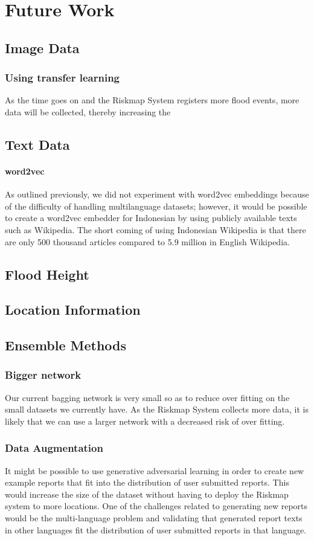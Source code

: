 \chapter{Future Work}

\section{Image Data}
\subsection{Using transfer learning}
As the time goes on and the Riskmap System registers more flood events, 
more data will be collected, thereby increasing the  

\section{Text Data}
\subsubsection{word2vec}
As outlined previously, we did not experiment with word2vec embeddings because
of the difficulty of handling multilanguage datasets; however, it would be
possible to create a word2vec embedder for Indonesian by using publicly
available texts such as Wikipedia. The short coming of using Indonesian Wikipedia 
is that there are only 500 thousand articles compared to 5.9 million in English Wikipedia.

\section{Flood Height}
\section{Location Information}

\section{Ensemble Methods}
\subsection{Bigger network}
Our current bagging network is very small so as to reduce over fitting on the
small datasets we currently have. As the Riskmap System collects more data, it
is likely that we can use a larger network with a decreased risk of over fitting.

\subsection{Data Augmentation}
It might be possible to use generative adversarial learning in order to create
new example reports that fit into the distribution of user submitted reports.
This would increase the size of the dataset without having to deploy the
Riskmap system to more locations. One of the challenges related to
generating new reports would be the multi-language problem and validating
that generated report texts in other languages fit the distribution of user
submitted reports in that language.

